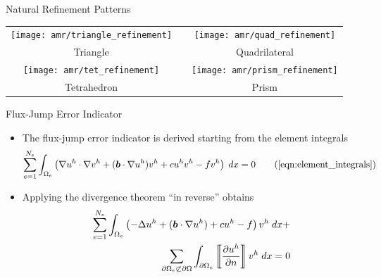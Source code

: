 \begin{frame}{Natural Refinement Patterns}
  \begin{tabular}{ccc}\\
    \texttt{[image: amr/triangle\_refinement]} &&
    \texttt{[image: amr/quad\_refinement]} \\
    Triangle && Quadrilateral \\
    \texttt{[image: amr/tet\_refinement]} &&
    \texttt{[image: amr/prism\_refinement]}  \\
    Tetrahedron && Prism
  \end{tabular}
\end{frame}


\begin{frame}{Flux-Jump Error Indicator}
\begin{itemize}
\item The flux-jump error indicator is derived starting from the element
  integrals
    \begin{equation}
      \eqneltint\tag{\ref{eqn:element_integrals}}
    \end{equation}

  \item Applying the divergence theorem ``in reverse'' obtains
    \begin{eqnarray}
      \sum_{e=1}^{N_e} \int_{\Omega_e}
      \left( -\Delta u^h  + ({\boldsymbol{b}} \cdot \nabla u^h) + cu^h
      -f \right) v^h \;  dx + \\
      \nonumber
      \sum_{\partial \Omega_e \not \subset  \partial \Omega}
      \int_{\partial \Omega_e} \left\llbracket \frac{\partial u^h}{\partial n} \right\rrbracket v^h \; dx=0
    \end{eqnarray}
\end{itemize}
\end{frame}


